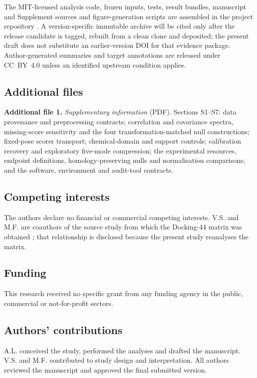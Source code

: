 The MIT-licensed analysis code, frozen inputs, tests, result bundles, manuscript
and Supplement sources and figure-generation scripts are assembled in the project repository
\cite{projectrepository}.
A version-specific immutable archive will be cited only after the release
candidate is tagged, rebuilt from a clean clone and deposited; the present draft
does not substitute an earlier-version DOI for that evidence package.
Author-generated summaries and target annotations are
released under CC~BY~4.0 unless an identified upstream condition applies.

\subsection*{Additional files}

\textbf{Additional file 1.} \emph{Supplementary information} (PDF).  Sections
S1--S7: data provenance and preprocessing contracts; correlation and covariance
spectra, missing-score sensitivity and the four transformation-matched null
constructions; fixed-pose scorer transport; chemical-domain and support
controls; calibration recovery and exploratory five-mode compression; the experimental
resources, endpoint definitions, homology-preserving nulls and normalisation
comparisons; and the software, environment and audit-tool contracts.

\subsection*{Competing interests}

The authors declare no financial or commercial competing interests.  V.S. and
M.F. are coauthors of the source study from which the Docking-44 matrix was
obtained \cite{nikitin2025}; that relationship is disclosed because the present
study reanalyses the matrix.

\subsection*{Funding}

This research received no specific grant from any funding agency in the public,
commercial or not-for-profit sectors.

\subsection*{Authors' contributions}

A.L. conceived the study, performed the analyses and drafted the manuscript.
V.S. and M.F. contributed to study design and interpretation.  All authors
reviewed the manuscript and approved the final submitted version.

